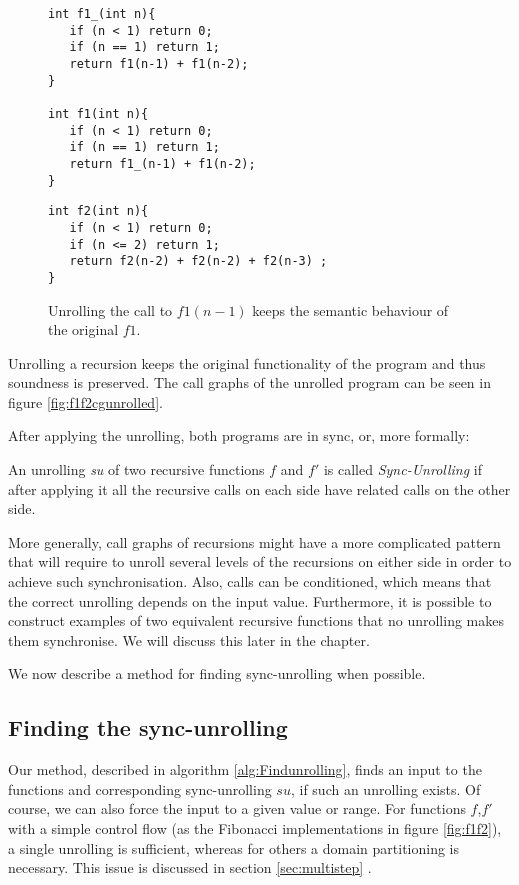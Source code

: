 \begin{figure}[h]
\begin{center}
\begin{minipage}{7 cm}
\begin{lstlisting}
int f1_(int n){
   if (n < 1) return 0;
   if (n == 1) return 1; 
   return f1(n-1) + f1(n-2);
}

int f1(int n){
   if (n < 1) return 0;
   if (n == 1) return 1; 
   return f1_(n-1) + f1(n-2);
}
\end{lstlisting}
\end{minipage}
\begin{minipage}{7 cm}
\begin{lstlisting}
int f2(int n){
   if (n < 1) return 0;
   if (n <= 2) return 1;
   return f2(n-2) + f2(n-2) + f2(n-3) ;
}
\end{lstlisting}
\end{minipage}
\caption{Unrolling the call to $f1(n-1)$ keeps the semantic behaviour of the original $f1$.}
\label{fig:f1f2unrolled}
\end{center}
\end{figure}
 Unrolling a recursion keeps the original functionality of the program and thus soundness is preserved. The call graphs of the unrolled program can be seen in figure \ref{fig:f1f2cgunrolled}. 

After applying the unrolling, both programs are in sync, or, more formally: 
\begin{definition}
An unrolling \emph{su} of two recursive functions $f$ and $f'$ is called \emph{Sync-Unrolling} if after applying it all the recursive calls on each side have related calls on the other side.
\end{definition}

More generally, call graphs of recursions might have a more complicated pattern that will require to unroll several levels of the recursions on either side in order to achieve such synchronisation. Also, calls can be conditioned, which means that the correct unrolling depends on the input value. Furthermore, it is possible to construct examples of two equivalent recursive functions that no unrolling makes them synchronise. We will discuss this later in the chapter. 

We now describe a method for finding sync-unrolling when possible.

\subsection{Finding the sync-unrolling}
Our method, described in algorithm \ref{alg:Findunrolling}, finds an input to the functions and corresponding sync-unrolling $su$, if such an unrolling exists. Of course, we can also force the input to a given value or range. For functions $f$,$f'$ with a simple control flow (as the Fibonacci implementations in figure \ref{fig:f1f2}), a single unrolling is sufficient, whereas for others a domain partitioning is necessary. This issue is discussed in section \ref{sec:multistep} . 

